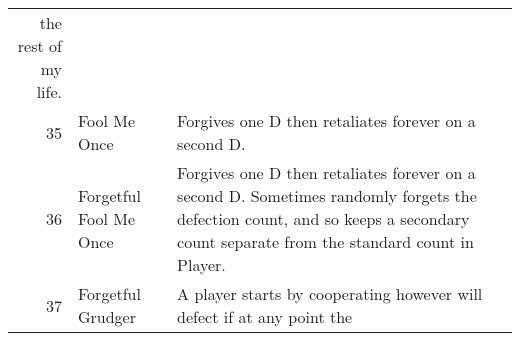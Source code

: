 \begin{table}[H]
\begin{adjustbox}{height=0.7\textwidth, width=1.1\textwidth}
\begin{tabular}{rlll}
	the rest of my life.                                                                                                                                                                                                                                                                                                                                                                                                                                                                                                                                                                                                                                                                                                                                                                                                                                                                                                                        \\
	35   & Fool Me Once                & Forgives one D then retaliates forever on a second D.                                                                             \\
	36   & Forgetful Fool Me Once      & Forgives one D then retaliates forever on a second D. Sometimes randomly
	forgets the defection count, and so keeps a secondary count separate from
	the standard count in Player.                                                                                                                                                                                                                                                                                                                                                                                                                                                                                                                                                                                                                                                                                                                                                                                                                                 \\
	37   & Forgetful Grudger           & A player starts by cooperating however will defect if at any point the

\end{tabular}
\end{adjustbox}
\end{table}

